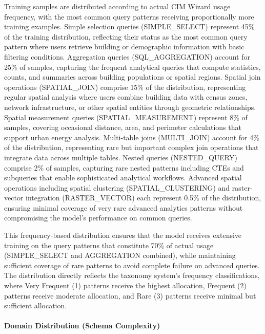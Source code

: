 Training samples are distributed according to actual CIM Wizard usage frequency, with the most common query patterns receiving proportionally more training examples. Simple selection queries (SIMPLE\_SELECT) represent 45\% of the training distribution, reflecting their status as the most common query pattern where users retrieve building or demographic information with basic filtering conditions. Aggregation queries (SQL\_AGGREGATION) account for 25\% of samples, capturing the frequent analytical queries that compute statistics, counts, and summaries across building populations or spatial regions. Spatial join operations (SPATIAL\_JOIN) comprise 15\% of the distribution, representing regular spatial analysis where users combine building data with census zones, network infrastructure, or other spatial entities through geometric relationships. Spatial measurement queries (SPATIAL\_MEASUREMENT) represent 8\% of samples, covering occasional distance, area, and perimeter calculations that support urban energy analysis. Multi-table joins (MULTI\_JOIN) account for 4\% of the distribution, representing rare but important complex join operations that integrate data across multiple tables. Nested queries (NESTED\_QUERY) comprise 2\% of samples, capturing rare nested patterns including CTEs and subqueries that enable sophisticated analytical workflows. Advanced spatial operations including spatial clustering (SPATIAL\_CLUSTERING) and raster-vector integration (RASTER\_VECTOR) each represent 0.5\% of the distribution, ensuring minimal coverage of very rare advanced analytics patterns without compromising the model's performance on common queries.

This frequency-based distribution ensures that the model receives extensive training on the query patterns that constitute 70\% of actual usage (SIMPLE\_SELECT and AGGREGATION combined), while maintaining sufficient coverage of rare patterns to avoid complete failure on advanced queries. The distribution directly reflects the taxonomy system's frequency classifications, where Very Frequent (1) patterns receive the highest allocation, Frequent (2) patterns receive moderate allocation, and Rare (3) patterns receive minimal but sufficient allocation.

\paragraph{Domain Distribution (Schema Complexity)}

